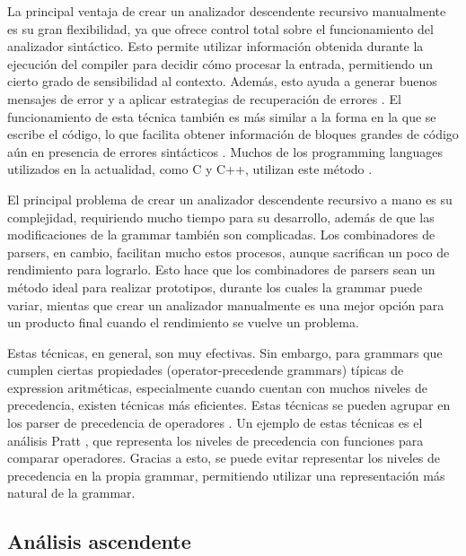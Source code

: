 La principal ventaja de crear un analizador descendente recursivo manualmente es
su gran flexibilidad, ya que ofrece control total sobre el funcionamiento del
analizador sintáctico. Esto permite utilizar información obtenida durante la
ejecución del \gls{compiler} para decidir cómo procesar la entrada, permitiendo
un cierto grado de sensibilidad al contexto. Además, esto ayuda a generar buenos
mensajes de error y a aplicar estrategias de recuperación de errores
\parencite{errors-clang}. El funcionamiento de esta técnica también es más
similar a la forma en la que se escribe el código, lo que facilita obtener
información de bloques grandes de código aún en presencia de errores sintácticos
\parencite{resilient-LL-parsing}. Muchos de los \glspl{programming language}
utilizados en la actualidad, como C y C++, utilizan este método
\parencite{parser-types-survey}.

El principal problema de crear un analizador descendente recursivo a mano es su
complejidad, requiriendo mucho tiempo para su desarrollo, además de que las
modificaciones de la \gls{grammar} también son complicadas. Los combinadores de
\glspl{parser}, en cambio, facilitan mucho estos procesos, aunque sacrifican un
poco de rendimiento para lograrlo. Esto hace que los combinadores de
\glspl{parser} sean un método ideal para realizar prototipos, durante los cuales
la \gls{grammar} puede variar, mientas que crear un analizador manualmente es
una mejor opción para un producto final cuando el rendimiento se vuelve un
problema.

Estas técnicas, en general, son muy efectivas. Sin embargo, para \glspl{grammar}
que cumplen ciertas propiedades (\glspl{operator-precedende grammar}) típicas de
\gls{expression} aritméticas, especialmente cuando cuentan con muchos niveles de
precedencia, existen técnicas más eficientes. Estas técnicas se pueden agrupar
en los \gls{parser} de precedencia de operadores
\parencite{operator-precedence-parser}. Un ejemplo de estas técnicas es el
análisis Pratt \parencite{pratt-parsing-paper}
\parencite{pratt-parsing-example}, que representa los niveles de precedencia con
funciones para comparar operadores. Gracias a esto, se puede evitar representar los niveles de
precedencia en la propia \gls{grammar}, permitiendo utilizar una representación
más natural de la \gls{grammar}.

\subsection{Análisis ascendente}

